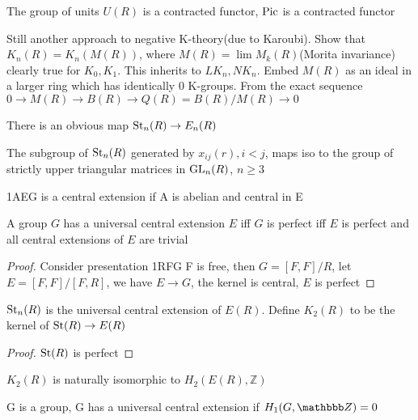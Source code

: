 \documentclass[main]{subfiles}
\begin{document}
\begin{example}
The group of units $U(R)$ is a contracted functor, $\operatorname{Pic}$ is a contracted functor
\end{example}

Still another approach to negative K-theory(due to Karoubi). Show that $K_n(R)=K_n(M(R))$, where $M(R)=\lim M_k(R)$(Morita invariance) clearly true for $K_0,K_1$. This inherits to $LK_n,NK_n$. Embed $M(R)$ as an ideal in a larger ring which has identically 0 K-groups. From the exact sequence $0\to M(R)\to B(R)\to Q(R)=B(R)/M(R)\to0$



There is an obvious map $\operatorname{St}_n(R)\to E_n(R)$

\begin{lemma}
The subgroup of $\operatorname{St}_n(R)$ generated by $x_{ij}(r), i<j$, maps iso to the group of strictly upper triangular matrices in $\operatorname{GL}_n(R)$, $n\geq3$
\end{lemma}

\begin{definition}
1\to A\to E\to G is a central extension if A is abelian and central in E
\end{definition}

\begin{theorem}
A group $G$ has a universal central extension $E$ iff $G$ is perfect iff $E$ is perfect and all central extensions of $E$ are trivial
\end{theorem}

\begin{proof}
Consider presentation
1\to R\to F\to G
F is free, then $G=[F,F]/R$, let $E=[F,F]/[F,R]$, we have $E\to G$, the kernel is central, $E$ is perfect
\end{proof}

\begin{theorem}[Milnor]
$\operatorname{St}_n(R)$ is the universal central extension of $E(R)$. Define $K_2(R)$ to be the kernel of $\operatorname{St}(R)\to E(R)$
\end{theorem}

\begin{proof}
$\operatorname{St}(R)$ is perfect
\end{proof}

\begin{corollary}
$K_2(R)$ is naturally isomorphic to $H_2(E(R),\mathbb Z)$
\end{corollary}

\begin{theorem}
G is a group, G has a universal central extension if $H_1(G,\mathbbb Z)=0$
\end{theorem}
\end{document}
